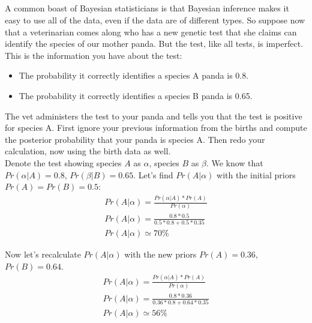 \documentclass{article}
\begin{document}
\subsection{}
A common boast of Bayesian statisticians is that Bayesian inference makes it
easy to use all of the data, even if the data are of different types.
So suppose now that a veterinarian comes along who has a new genetic test that
she claims can identify the species of our mother panda. But the test, like all
tests, is imperfect. This is the information you have about the test:
\begin{itemize}
  \item The probability it correctly identifies a species A panda is 0.8.
  \item The probability it correctly identifies a species B panda is 0.65.
\end{itemize}
The vet administers the test to your panda and tells you that the test is
positive for species A. First ignore your previous information from the births
and compute the posterior probability that your panda is species A. Then redo
your calculation, now using the birth data as well. \\

Denote the test showing species $A$ as $\alpha$, species $B$ as $\beta$.
We know that $Pr(\alpha|A) = 0.8$, $Pr(\beta|B) = 0.65$.
Let's find $Pr(A|\alpha)$ with the initial priors $Pr(A) = Pr(B) = 0.5$:
\begin{gather}
  Pr(A|\alpha) = \frac{Pr(\alpha|A) * Pr(A)}{Pr(\alpha)} \\
  Pr(A|\alpha) = \frac{0.8 * 0.5}{0.5 * 0.8 + 0.5 * 0.35} \\
  Pr(A|\alpha) \simeq 70\%
\end{gather}

Now let's recalculate $Pr(A|\alpha)$ with the new priors $Pr(A) = 0.36$,
$Pr(B) = 0.64$.
\begin{gather}
  Pr(A|\alpha) = \frac{Pr(\alpha|A) * Pr(A)}{Pr(\alpha)} \\
  Pr(A|\alpha) = \frac{0.8 * 0.36}{0.36 * 0.8 + 0.64 * 0.35} \\
  Pr(A|\alpha) \simeq 56\%
\end{gather}
\end{document}
